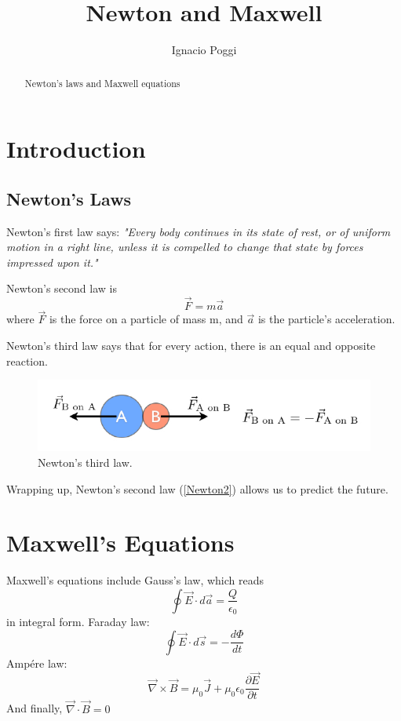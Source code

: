\documentclass{emulateapj}
\newcommand\be{\begin{equation}}
\newcommand\ee{\end{equation}}
\begin{document}
 
\title{Newton and Maxwell}

\author{Ignacio Poggi}

\begin{abstract}

Newton's laws and Maxwell equations

\end{abstract}



\section{Introduction}

\subsection{Newton’s Laws} 
Newton’s first law says: \textit{"Every body continues in its state of rest, 
or of uniform motion in a right line, unless it is compelled to change 
that state by forces impressed upon it."}

Newton’s second law is 
\be
\vec F = m \vec a \label{Newton2}
\ee
where $\vec F$ is the force on a particle of mass m, 
and $\vec a$ is the particle’s acceleration.

Newton's third law says that for every action, there is an equal and opposite reaction.

\begin{center}
\begin{figure}[h]
\includegraphics[scale = 0.35]{n3l.png}
\caption{Newton's third law.}
\end{figure}
\end{center}

Wrapping up, Newton's second law (\ref{Newton2}) allows us to predict the future.

\section{Maxwell’s Equations} 
Maxwell’s equations include Gauss’s law, which reads 
\be
\oint \vec E \cdot d\vec a = \frac{Q}{\epsilon_0} 
\ee
in integral form.\newline
Faraday law:
\be
\oint \vec E \cdot d\vec s = -\frac{d\Phi}{dt} 
\ee
Amp\'ere law:
\be
\vec \nabla \times \vec B = \mu_0 \vec J + \mu_0 \epsilon_0 \frac{\partial \vec E}{\partial t} 
\ee
And finally, $\vec \nabla \cdot \vec B = 0$
\clearpage
\end{document}
